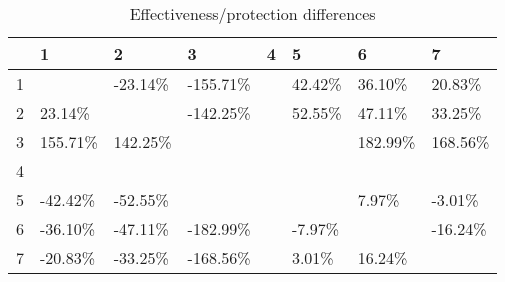\begin{table}[ht]
\centering
\begin{tabular}{rlllllll}
  \hline
 & 1 & 2 & 3 & 4 & 5 & 6 & 7 \\ 
  \hline
1 &  & -23.14\% & -155.71\% &  & 42.42\% & 36.10\% & 20.83\% \\ 
  2 & 23.14\% &  & -142.25\% &  & 52.55\% & 47.11\% & 33.25\% \\ 
  3 & 155.71\% & 142.25\% &  &  &  & 182.99\% & 168.56\% \\ 
  4 &  &  &  &  &  &  &  \\ 
  5 & -42.42\% & -52.55\% &  &  &  & 7.97\% & -3.01\% \\ 
  6 & -36.10\% & -47.11\% & -182.99\% &  & -7.97\% &  & -16.24\% \\ 
  7 & -20.83\% & -33.25\% & -168.56\% &  & 3.01\% & 16.24\% &  \\ 
   \hline
\end{tabular}
\caption{Effectiveness/protection differences} 
\end{table}
